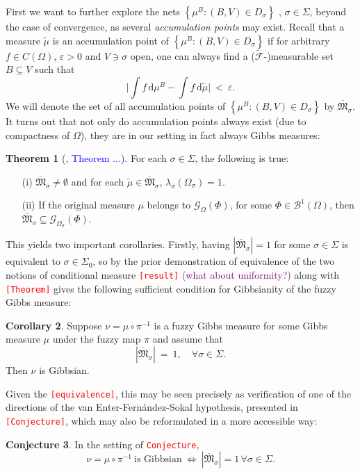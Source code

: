 \documentclass[12pt]{article}
\newcommand{\BB}{\mathscr{B}}
\renewcommand{\d}{\mathrm{d}}
\newcommand{\F}{\mathcal{F}}
\newcommand{\G}{\mathcal{G}}
\newcommand{\MM}{\mathfrak{M}}
\newcommand{\set}[1]{\left\{#1\right\}}
\newcommand{\1}{\mathbbm{1}}
\newcommand{\5}{\vspace{0.5cm}}
\renewcommand{\tilde}{\widetilde}
\theoremstyle{definition}
\newtheorem{thm}{Theorem}[section]
\newtheorem{cor}[thm]{Corollary}
\newtheorem{conj}[thm]{Conjecture}
\begin{document}
First we want to further explore the nets $\set{\mu^B:(B,V)\in D_\sigma}$ , $\sigma\in\Sigma$, beyond the case of convergence, as several \textit{accumulation points} may exist. Recall that a measure $\tilde{\mu}$ is an accumulation point of $\set{\mu^B:(B,V)\in D_\sigma}$ if for arbitrary $f\in C(\Omega)$, $\varepsilon>0$ and $V\ni \sigma$ open, one can always find a ($\tilde{\F}$-)measurable set $B\subseteq V$ such that 
$$\Big|\int f\,\d\mu^B - \int f\,\d\tilde{\mu}\Big| ~<~ \varepsilon.$$
We will denote the set of all accumulation points of $\set{\mu^B:(B,V)\in D_\sigma}$ by $\overline{\MM}_\sigma$. It turns out that not only do accumulation points always exist (due to compactness of $\Omega$), they are in our setting in fact always Gibbs measures:
\begin{thm}[\cite{Ber}, \textcolor{blue}{Theorem ...}]
For each $\sigma\in\Sigma$, the following is true:
\begin{itemize}
	\item[(i)] $\overline{\MM}_\sigma\neq \emptyset$ and for each $\tilde{\mu}\in\overline{\MM}_\sigma$, $\lambda_\sigma(\Omega_\sigma)=1$.
	\item[(ii)] If the original measure $\mu$ belongs to $\G_\Omega(\Phi)$, for some $\Phi\in\BB^1(\Omega)$, then $\overline{\MM}_\sigma\subseteq\G_{\Omega_\sigma}(\Phi)$.
\end{itemize}
\end{thm} 

This yields two important corollaries. Firstly, having $|\overline{\MM}_\sigma|=1$ for some $\sigma\in\Sigma$ is equivalent to $\sigma\in\Sigma_0$, so by the prior demonstration of equivalence of the two notions of conditional measure \textcolor{red}{\texttt{[result]}} \textcolor{purple}{(what about uniformity?)} along with \textcolor{red}{\texttt{[Theorem]}} gives the following sufficient condition for Gibbsianity of the fuzzy Gibbs measure:
\begin{cor}
Suppose $\nu=\mu\circ\pi^{-1}$ is a fuzzy Gibbs measure for some Gibbs measure $\mu$ under the fuzzy map $\pi$ and assume that 
$$|\overline{\MM}_\sigma| ~=~ 1, \quad \forall \sigma\in\Sigma.$$
Then $\nu$ is Gibbsian.
\end{cor}

Given the \textcolor{red}{\texttt{[equivalence]}}, this may be seen precisely as verification of one of the directions of the van Enter-Fern\'andez-Sokal hypothesis, presented in \textcolor{red}{\texttt{[Conjecture]}}, which may also be reformulated in a more accessible way:
\begin{conj}
In the setting of \textcolor{red}{\texttt{Conjecture}},
$$\nu=\mu\circ\pi^{-1}~\text{is Gibbsian}~\iff~|\overline{\MM}_\sigma|=1\,\forall \sigma\in\Sigma.$$
\end{conj}
\end{document}
